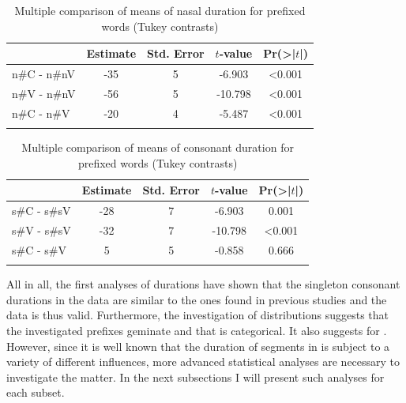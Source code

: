   \begin{table}
  	\caption{Multiple comparison of means of nasal duration for prefixed words (Tukey contrasts)\label{tbl:Tukey un}}
  		\begin{tabular} {>{\ttfamily}lSSSS[table-format=<1.3]}
			\lsptoprule
  			             & {Estimate} & {Std. Error} & {$t$-value}  & {Pr(>|$t$|)}\\
  			\midrule
  			n\#C - n\#nV & -35 &  5 & -6.903  & <0.001\\
  			n\#V - n\#nV & -56 &  5 & -10.798 & <0.001\\
  			n\#C - n\#V  & -20 &  4 & -5.487  & <0.001 \\
  			\lspbottomrule                                                                                
		\end{tabular}
  	
  \end{table}
  
  
  
  \begin{table}
  	\caption{Multiple comparison of means of consonant duration for prefixed words (Tukey contrasts)\label{tbl:Tukey dis}}
  		\begin{tabular} {>{\ttfamily}lSSSS[table-format=<1.3]}
			\lsptoprule
  			             & {Estimate} & {Std. Error} & {$t$-value}  & {Pr(>|$t$|)}\\
  			\midrule
  			s\#C - s\#sV  &  -28 &  7  & -6.903   & 0.001\\
  			s\#V - s\#sV  & -32  &  7  & -10.798  & <0.001\\
  			s\#C - s\#V   &  5 &  5  &  -0.858  &  0.666\\
            \lspbottomrule                                                                                
		\end{tabular}
  \end{table}

All in all, the first analyses of durations have shown that the singleton consonant durations in the data are similar to the ones found in previous studies and the data is thus valid. Furthermore, the investigation of distributions suggests that the investigated prefixes geminate and that  is categorical. It also suggests  for . 
However, since it is well known that the duration of segments in  is subject to a variety of different influences, more advanced statistical analyses are necessary to investigate the matter. In the next subsections I will present such analyses for each subset.

